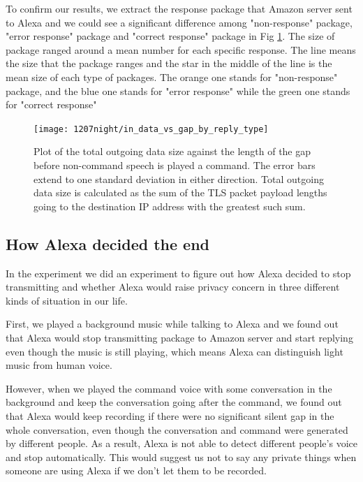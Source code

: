 To confirm our results, we extract the response package that Amazon server sent to Alexa and we could see a significant difference among "non-response" package, "error response" package and "correct response" package in Fig \ref{fig:postfix_variablegap_sizes}. The size of package ranged around a mean number for each specific response. The line means the size that the package ranges and the star in the middle of the line is the mean size of each type of packages. The orange one stands for "non-response" package, and the blue one stands for "error response" while the green one stands for "correct response" 

\begin{figure}[]
    \centering
    \texttt{[image: 1207night/in\_data\_vs\_gap\_by\_reply\_type]}
    \caption{Plot of the total outgoing data size against the length of the gap before non-command speech is played a command. The error bars extend to one standard deviation in either direction. Total outgoing data size is calculated as the sum of the TLS packet payload lengths going to the destination IP address with the greatest such sum.}
    \label{fig:postfix_variablegap_sizes}
\end{figure}

\subsection{How Alexa decided the end}

In the experiment \todo{[3]} we did an experiment to figure out how Alexa decided to stop transmitting and whether Alexa would raise privacy concern in three different kinds of situation in our life.

First, we played a background music while talking to Alexa and we found out that Alexa would stop transmitting package to Amazon server and start replying even though the music is still playing, which means Alexa can distinguish light music from human voice.

However, when we played the command voice with some conversation in the background and keep the conversation going after the command, we found out that Alexa would keep recording if there were no significant silent gap in the whole conversation, even though the conversation and command were generated by different people. As a result, Alexa is not able to detect different people's voice and stop automatically. This would suggest us not to say any private things when someone are using Alexa if we don't let them to be recorded. 

